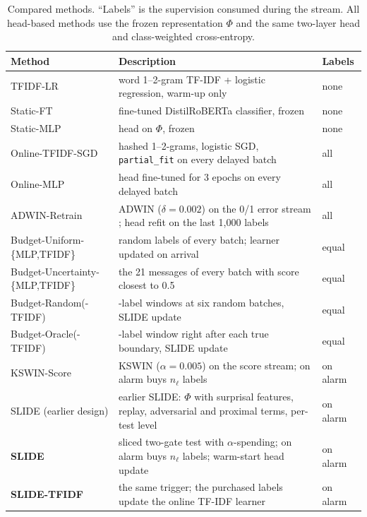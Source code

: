 \begin{table}[t]
\centering
\caption{Compared methods. ``Labels'' is the supervision consumed during the stream. All head-based methods use the frozen representation $\Phi$ and the same two-layer head and class-weighted cross-entropy.}
\label{tab:methods}
\scriptsize
\setlength{\tabcolsep}{3pt}
\begin{tabular}{@{}>{\raggedright\arraybackslash}p{3.1cm}>{\raggedright\arraybackslash}p{9.2cm}l@{}}
\toprule
Method & Description & Labels \\
\midrule
TFIDF-LR & word 1--2-gram TF-IDF + logistic regression, warm-up only & none \\
Static-FT & fine-tuned DistilRoBERTa classifier, frozen & none \\
Static-MLP & head on $\Phi$, frozen & none \\
\midrule
Online-TFIDF-SGD & hashed 1--2-grams, logistic SGD, \texttt{partial\_fit} on every delayed batch & all \\
Online-MLP & head fine-tuned for 3 epochs on every delayed batch & all \\
ADWIN-Retrain & ADWIN ($\delta=0.002$) on the 0/1 error stream \cite{bifet2007}; head refit on the last 1{,}000 labels & all \\
\midrule
Budget-Uniform-\{MLP,TFIDF\} & 21 random labels of every batch; learner updated on arrival & equal \\
Budget-Uncertainty-\{MLP,TFIDF\} & the 21 messages of every batch with score closest to 0.5 \cite{zliobaite2014} & equal \\
Budget-Random(-TFIDF) & 500-label windows at six random batches, SLIDE update & equal \\
Budget-Oracle(-TFIDF) & 500-label window right after each true boundary, SLIDE update & equal \\
\midrule
KSWIN-Score & KSWIN ($\alpha=0.005$) \cite{raab2020} on the score stream; on alarm buys $n_\ell$ labels & on alarm \\
SLIDE (earlier design) & earlier SLIDE: $\Phi$ with surprisal features, replay, adversarial and proximal terms, per-test level & on alarm \\
\textbf{SLIDE} & sliced two-gate test with $\alpha$-spending; on alarm buys $n_\ell$ labels; warm-start head update & on alarm \\
\textbf{SLIDE-TFIDF} & the same trigger; the purchased labels update the online TF-IDF learner & on alarm \\
\bottomrule
\end{tabular}
\end{table}
